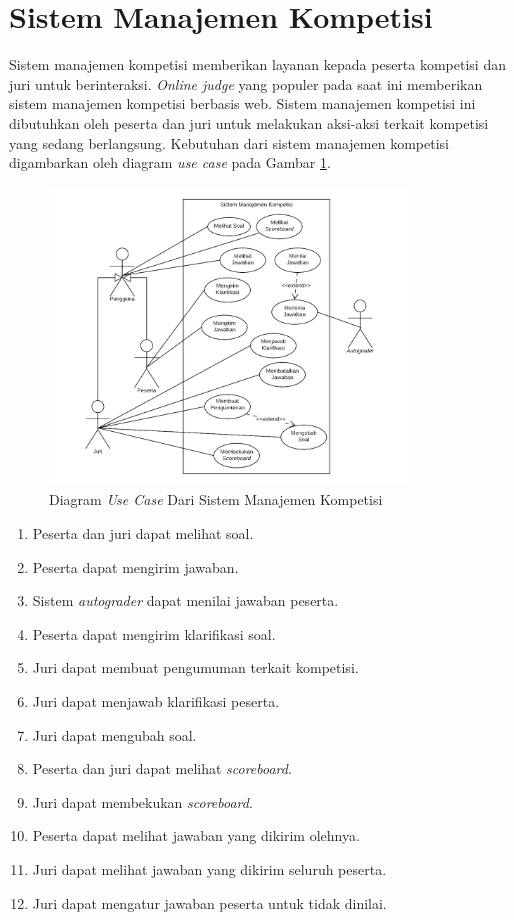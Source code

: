 \section{Sistem Manajemen Kompetisi}

\par Sistem manajemen kompetisi memberikan layanan kepada peserta kompetisi dan juri untuk berinteraksi. \textit{Online judge} yang populer pada saat ini memberikan sistem manajemen kompetisi berbasis web. Sistem manajemen kompetisi ini dibutuhkan oleh peserta dan juri untuk melakukan aksi-aksi terkait kompetisi yang sedang berlangsung. Kebutuhan dari sistem manajemen kompetisi digambarkan oleh diagram \textit{use case} pada Gambar \ref{fig:oj-use-case}.

\begin{figure}[ht!]
    \centering
    \includegraphics[width=0.85\textwidth]{images/oj-use-case}
    \caption{Diagram \textit{Use Case} Dari Sistem Manajemen Kompetisi}
    \label{fig:oj-use-case}
\end{figure}

\begin{enumerate}
    \item Peserta dan juri dapat melihat soal.
    \item Peserta dapat mengirim jawaban.
    \item Sistem \textit{autograder} dapat menilai jawaban peserta.
    \item Peserta dapat mengirim klarifikasi soal.
    \item Juri dapat membuat pengumuman terkait kompetisi.
    \item Juri dapat menjawab klarifikasi peserta.
    \item Juri dapat mengubah soal.
    \item Peserta dan juri dapat melihat \textit{scoreboard}.
    \item Juri dapat membekukan \textit{scoreboard}.
    \item Peserta dapat melihat jawaban yang dikirim olehnya.
    \item Juri dapat melihat jawaban yang dikirim seluruh peserta.
    \item Juri dapat mengatur jawaban peserta untuk tidak dinilai.
\end{enumerate}

